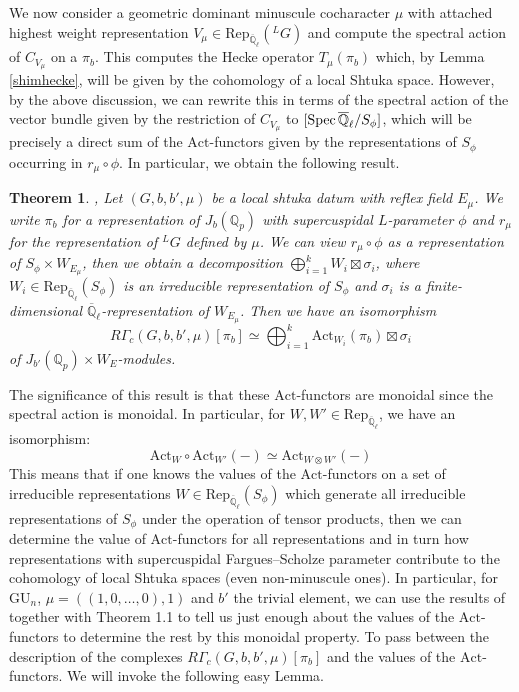 \documentclass[reqno,11pt]{amsart}
\newtheorem{theorem}{Theorem}[section]
\theoremstyle{remark}
\def\Spec{\mathop{\rm Spec}}
\newcommand{\GU}{\mathrm{GU}}
\newcommand{\Act}{\mathrm{Act}}
\newcommand{\Rep}{\mathrm{Rep}}
\def\ol{\overline}
\begin{document}
We now consider a geometric dominant minuscule cocharacter $\mu$ with attached highest weight representation $V_{\mu} \in \Rep_{\ol{\mathbb{Q}}_{\ell}}(\phantom{}^{L}G)$ and compute the spectral action of $C_{V_{\mu}}$ on a $\pi_{b}$. This computes the Hecke operator $T_{\mu}(\pi_{b})$ which, by Lemma \ref{shimhecke}, will be given by the cohomology of a local Shtuka space. However, by the above discussion, we can rewrite this in terms of the spectral action of the vector bundle given by the restriction of $C_{V_{\mu}}$ to $[\Spec{\ol{\mathbb{Q}}_{\ell}}/S_{\phi}]$, which will be precisely a direct sum of the $\Act$-functors given by the representations of $S_{\phi}$ occurring in $r_{\mu} \circ \phi$. In particular, we obtain the following result. 
\begin{theorem}{\cite[Corollary~3.11]{Ham},\cite[Section~X.2]{FS}}{\label{thm: RGammavsAct}}
Let $(G,b,b',\mu)$ be a local shtuka datum with reflex field $E_{\mu}$. We write $\pi_{b}$ for a representation of $J_{b}(\mathbb{Q}_{p})$ with supercuspidal $L$-parameter $\phi$ and $r_{\mu}$ for the representation of $\phantom{}^{L}G$ defined by $\mu$. We can view $r_{\mu} \circ \phi$ as a representation of $S_{\phi} \times W_{E_{\mu}}$, then we obtain a decomposition $\bigoplus_{i = 1}^{k} W_{i} \boxtimes \sigma_{i}$, where $W_{i} \in \Rep_{\overline{\mathbb{Q}}_{\ell}}(S_{\phi})$ is an irreducible representation of $S_{\phi}$ and $\sigma_{i}$ is a finite-dimensional $\overline{\mathbb{Q}}_{\ell}$-representation of $W_{E_{\mu}}$. Then we have an isomorphism
\[ R\Gamma_{c}(G,b,b',\mu)[\pi_{b}] \simeq \bigoplus_{i = 1}^{k} \Act_{W_{i}}(\pi_{b}) \boxtimes \sigma_{i} \]
 of $J_{b'}(\mathbb{Q}_{p}) \times W_{E}$-modules. 
\end{theorem}
The significance of this result is that these $\Act$-functors are monoidal since the spectral action is monoidal. In particular, for $W,W' \in \Rep_{\ol{\mathbb{Q}}_{\ell}}$, we have an isomorphism:
\[ \Act_{W} \circ \Act_{W'}(-) \simeq \Act_{W \otimes W'}(-) \]
This means that if one knows the values of the $\Act$-functors on a set of irreducible representations $W \in \Rep_{\ol{\mathbb{Q}}_{\ell}}(S_{\phi})$ which generate all irreducible representations of $S_{\phi}$ under the operation of tensor products, then we can determine the value of $\Act$-functors for all representations and in turn how representations with supercuspidal Fargues--Scholze parameter contribute to the cohomology of local Shtuka spaces (even non-minuscule ones). In particular, for $\GU_{n}$, $\mu = ((1,0,\ldots,0),1)$ and $b'$ the trivial element, we can use the results of \cite{BMN} together with Theorem 1.1 to tell us just enough about the values of the $\Act$-functors to determine the rest by this monoidal property. To pass between the description of the complexes $R\Gamma_{c}(G,b,b',\mu)[\pi_{b}]$ and the values of the $\Act$-functors. We will invoke the following easy Lemma. 
\end{document}
